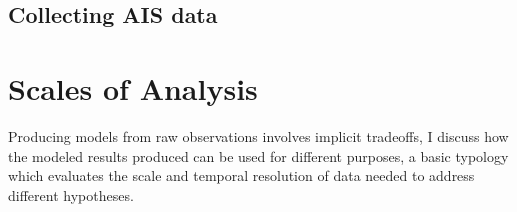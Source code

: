 	\subsection{Collecting AIS data}





\section{Scales of Analysis}


Producing models from raw observations involves implicit tradeoffs, I discuss how the modeled results produced can be used for different purposes, a basic typology which evaluates the scale and temporal resolution of data needed to address different hypotheses.






